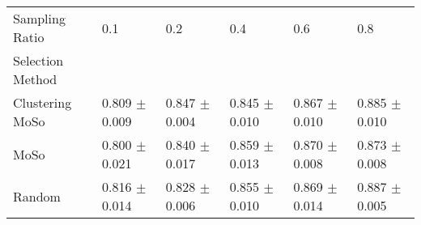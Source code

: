 \begin{tabular}{llllll}
\toprule
Sampling Ratio & 0.1 & 0.2 & 0.4 & 0.6 & 0.8 \\
Selection Method &  &  &  &  &  \\
\midrule
Clustering MoSo & 0.809 $\pm$ 0.009 & 0.847 $\pm$ 0.004 & 0.845 $\pm$ 0.010 & 0.867 $\pm$ 0.010 & 0.885 $\pm$ 0.010 \\
MoSo & 0.800 $\pm$ 0.021 & 0.840 $\pm$ 0.017 & 0.859 $\pm$ 0.013 & 0.870 $\pm$ 0.008 & 0.873 $\pm$ 0.008 \\
Random & 0.816 $\pm$ 0.014 & 0.828 $\pm$ 0.006 & 0.855 $\pm$ 0.010 & 0.869 $\pm$ 0.014 & 0.887 $\pm$ 0.005 \\
\bottomrule
\end{tabular}
